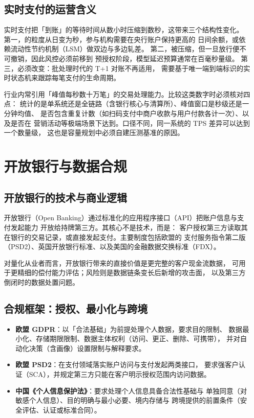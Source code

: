 \subsection{实时支付的运营含义}

实时支付把「到账」的等待时间从数小时压缩到数秒，这带来三个结构性变化。
第一，的粒度从日变为秒，参与机构需要在央行账户保持更高的
日间余额，或依赖流动性节约机制（LSM）做双边与多边轧差。
第二，被压缩，但一旦放行便不可撤销，因此风控必须前移到
预授权阶段，模型延迟预算通常在百毫秒量级。
第三，必须改变：批处理时代的 T+1 对账不再适用，
需要基于唯一端到端标识的实时状态机来跟踪每笔支付的生命周期。

\begin{notebox}
行业内常引用「峰值每秒数十万笔」的交易处理能力。比较这类数字时必须核对四点：
统计的是单系统还是全链路（含银行核心与清算所）、峰值窗口是秒级还是一分钟均值、
是否包含重复计数（如扫码支付中商户收款与用户付款各计一次）、以及是否在
营销活动等极端场景下达到。口径不同，同一系统的 TPS 差异可以达到一个数量级，
这也是容量规划中必须自建压测基准的原因。
\end{notebox}

\section{开放银行与数据合规}

\subsection{开放银行的技术与商业逻辑}

开放银行（Open Banking）通过标准化的应用程序接口（API）把账户信息与支付发起能力
开放给持牌第三方。其核心不是技术，而是：
客户授权第三方读取其在银行的交易记录，或直接发起支付。主要制度包括欧盟的
支付服务指令第二版（PSD2）、英国开放银行标准、以及美国的金融数据交换标准（FDX）。

对量化从业者而言，开放银行带来的直接价值是更完整的客户现金流数据，
可用于更精细的偿付能力评估；风险则是数据链条变长后新增的攻击面，
以及第三方倒闭时的数据处置问题。

\subsection{合规框架：授权、最小化与跨境}

\begin{itemize}[leftmargin=*]
  \item \textbf{欧盟 GDPR}：以「合法基础」为前提处理个人数据，要求目的限制、
        数据最小化、存储期限限制、数据主体权利（访问、更正、删除、可携带），
        并对自动化决策（含画像）设置限制与解释要求。
  \item \textbf{欧盟 PSD2}：在支付领域落实账户访问与支付发起两类接口，
        要求强客户认证（SCA），并规定第三方只能在客户明示授权范围内访问数据。
  \item \textbf{中国《个人信息保护法》}：要求处理个人信息具备合法性基础与
        单独同意（对敏感个人信息）、目的明确与最小必要、境内存储与
        跨境提供的前置条件（安全评估、认证或标准合同）。
\end{itemize}

